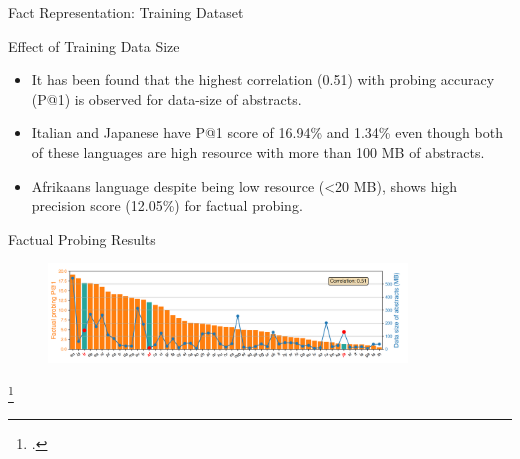 \documentclass{beamer}
\begin{document}
	\begin{frame}{Fact Representation: Training Dataset}
		\begin{block}{\scriptsize Effect of Training Data Size}\scriptsize
			\begin{itemize}
				\item It has been found that the highest correlation (0.51) with probing accuracy (P@1) is observed for data-size of abstracts. 
				\item Italian and Japanese have P@1 score of 16.94\% and 1.34\% even though both of these languages are high resource with more than 100 MB of abstracts. 
				\item Afrikaans language despite being low resource (\textless 20 MB), shows high precision score (12.05\%) for factual probing.
			\end{itemize}
		\end{block}
		\begin{block}{\scriptsize Factual Probing Results\footnotemark}
			\begin{figure}
				\centering
				\includegraphics[width=0.85\textwidth]{data-volume}
			\end{figure}
		\end{block}\footcitetext{zhao2024tracing}
	\end{frame}
	
\end{document}
